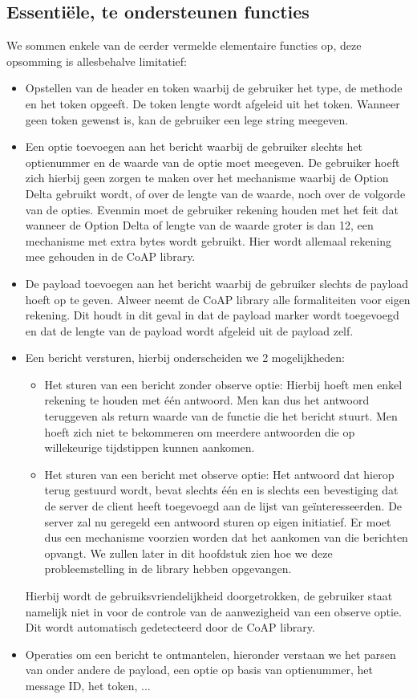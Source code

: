 \subsection{Essenti\"{e}le, te ondersteunen functies}

We sommen enkele van de eerder vermelde elementaire functies op, deze opsomming is allesbehalve limitatief:

\begin{itemize}
\item Opstellen van de header en token waarbij de gebruiker het type, de methode en het token opgeeft. De token lengte wordt afgeleid uit het token. Wanneer geen token gewenst is, kan de gebruiker een lege string meegeven.
\item Een optie toevoegen aan het bericht waarbij de gebruiker slechts het optienummer en de waarde van de optie moet meegeven. De gebruiker hoeft zich hierbij geen zorgen te maken over het mechanisme waarbij de Option Delta gebruikt wordt, of over de lengte van de waarde, noch over de volgorde van de opties. Evenmin moet de gebruiker rekening houden met het feit dat wanneer de Option Delta of lengte van de waarde groter is dan 12, een mechanisme met extra bytes wordt gebruikt. Hier wordt allemaal rekening mee gehouden in de CoAP library.
\item De payload toevoegen aan het bericht waarbij de gebruiker slechts de payload hoeft op te geven. Alweer neemt de CoAP library alle formaliteiten voor eigen rekening. Dit houdt in dit geval in dat de payload marker wordt toegevoegd en dat de lengte van de payload wordt afgeleid uit de payload zelf.
\item Een bericht versturen, hierbij onderscheiden we 2 mogelijkheden:
\begin{itemize}
\item Het sturen van een bericht zonder observe optie: Hierbij hoeft men enkel rekening te houden met \'{e}\'{e}n antwoord. Men kan dus het antwoord teruggeven als return waarde van de functie die het bericht stuurt. Men hoeft zich niet te bekommeren om meerdere antwoorden die op willekeurige tijdstippen kunnen aankomen.
\item Het sturen van een bericht met observe optie: Het antwoord dat hierop terug gestuurd wordt, bevat slechts \'{e}\'{e}n en is slechts een bevestiging dat de server de client heeft toegevoegd aan de lijst van ge\"{i}nteresseerden. De server zal nu geregeld een antwoord sturen op eigen initiatief. Er moet dus een mechanisme voorzien worden dat het aankomen van die berichten opvangt. We zullen later in dit hoofdstuk zien hoe we deze probleemstelling in de library hebben opgevangen.
\end{itemize}
Hierbij wordt de gebruiksvriendelijkheid doorgetrokken, de gebruiker staat namelijk niet in voor de controle van de aanwezigheid van een observe optie. Dit wordt automatisch gedetecteerd door de CoAP library.
\item Operaties om een bericht te ontmantelen, hieronder verstaan we het parsen van onder andere de payload, een optie op basis van optienummer, het message ID, het token, ...
\end{itemize}

